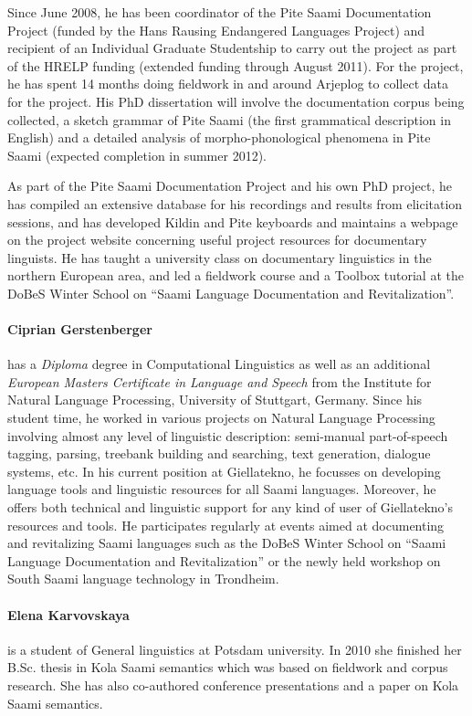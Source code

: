 \documentclass[a4paper,12pt]{article}
\begin{document}
{{{{Since June 2008, he has been coordinator of the Pite Saami Documentation Project (funded by the Hans Rausing Endangered Languages Project) and recipient of an Individual Graduate Studentship to carry out the project as part of the HRELP funding (extended funding through August 2011). For the project, he has spent 14 months doing fieldwork in and around Arjeplog to collect data for the project. His PhD dissertation will involve the documentation corpus being collected, a sketch grammar of Pite Saami (the first grammatical description in English) and a detailed analysis of morpho-phonological phenomena in Pite Saami (expected completion in summer 2012).

As part of the Pite Saami Documentation Project and his own PhD project, he has compiled an extensive database for his recordings and results from elicitation sessions, and has developed Kildin and Pite keyboards and maintains a webpage on the project website concerning useful project resources for documentary linguists. He has taught a university class on documentary linguistics in the northern European area, and led a fieldwork course and a Toolbox tutorial at the DoBeS Winter School on “Saami Language Documentation and Revitalization”.

\paragraph{Ciprian Gerstenberger} has a \textit{Diploma} degree in Computational Linguistics as well as an additional  \textit{European Masters Certificate in Language and Speech} from the Institute for Natural Language Processing, University of Stuttgart, Germany. Since his student time, he worked in various projects on Natural Language Processing involving almost any level of linguistic description: semi-manual part-of-speech tagging, parsing, treebank building and searching, text generation, dialogue systems, etc.  In his current position at Giellatekno, he focusses on developing language tools and linguistic resources for all Saami languages.  Moreover, he offers both technical and linguistic support for any kind of user of Giellatekno's resources and tools. He participates regularly at events aimed at documenting and revitalizing Saami languages such as the DoBeS Winter School on “Saami Language Documentation and Revitalization” or the newly held workshop on South Saami language technology in Trondheim.

\paragraph{Elena Karvovskaya} is a student of General linguistics at Potsdam university. In 2010 she finished her B.Sc. thesis in Kola Saami semantics which was based on fieldwork and corpus research. She has also co-authored conference presentations and a paper on Kola Saami semantics.

}}}}
\end{document}

